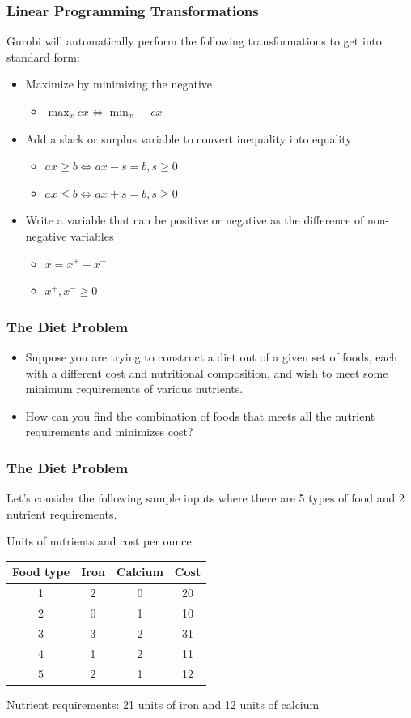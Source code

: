 \documentclass[12pt,handout]{beamer}
\begin{document}
\begin{frame}
\frametitle{Linear Programming Transformations}
Gurobi will automatically perform the following transformations to get into standard form:
\begin{itemize}
\item Maximize by minimizing the negative
    \begin{itemize}
    \item $\max_x cx \Leftrightarrow \min_x -cx$
    \end{itemize}
\item Add a slack or surplus variable to convert inequality into equality
    \begin{itemize}
    \item $ax \ge b \Leftrightarrow ax - s = b, s \ge 0$
    \item $ax \le b \Leftrightarrow ax + s = b, s \ge 0$
    \end{itemize}
\item Write a variable that can be positive or negative as the difference of non-negative variables
    \begin{itemize}
    \item $x = x^+ - x^-$
    \item $x^+, x^- \ge 0$
    \end{itemize}
\end{itemize}
\end{frame}

\begin{frame}
\frametitle{The Diet Problem}
\begin{itemize}
\item Suppose you are trying to construct a diet out of a given set of foods, each with a different cost and nutritional composition, and wish to meet some minimum requirements of various nutrients.
\item How can you find the combination of foods that meets all the nutrient requirements and minimizes cost?
\end{itemize}
\end{frame}

\begin{frame}
\frametitle{The Diet Problem}
Let's consider the following sample inputs where there are 5 types of food and 2 nutrient requirements.
\begin{center}
Units of nutrients and cost per ounce
\begin{tabular} {c | c | c | c}
Food type & Iron & Calcium & Cost \\
\hline
1 & 2 & 0 & 20 \\
2 & 0 & 1 & 10 \\
3 & 3 & 2 & 31 \\
4 & 1 & 2 & 11 \\
5 & 2 & 1 & 12 \\
\end{tabular}
\end{center}
Nutrient requirements: 21 units of iron and 12 units of calcium
\end{frame}
\end{document}
